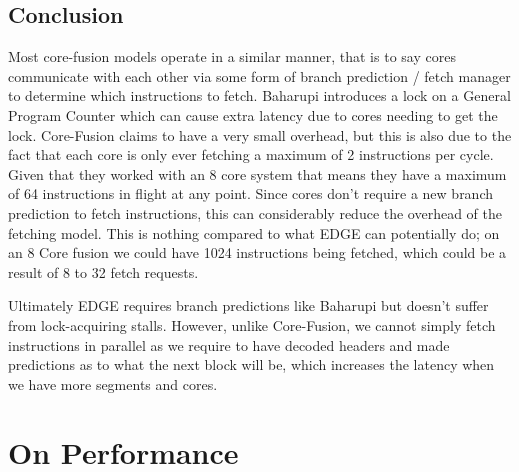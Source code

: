 \subsection{Conclusion}
Most core-fusion models operate in a similar manner, that is to say cores communicate with each other via some form of branch prediction / fetch manager to determine which instructions to fetch.
Baharupi introduces a lock on a General Program Counter which can cause extra latency due to cores needing to get the lock.
Core-Fusion claims to have a very small overhead, but this is also due to the fact that each core is only ever fetching a maximum of 2 instructions per cycle.
Given that they worked with an 8 core system that means they have a maximum of 64 instructions in flight at any point.
Since cores don't require a new branch prediction to fetch instructions, this can considerably reduce the overhead of the fetching model.
This is nothing compared to what EDGE can potentially do; on an 8 Core fusion we could have 1024 instructions being fetched, which could be a result of 8 to 32 fetch requests.

Ultimately EDGE requires branch predictions like Baharupi but doesn't suffer from lock-acquiring stalls.
However, unlike Core-Fusion, we cannot simply fetch instructions in parallel as we require to have decoded headers and made predictions as to what the next block will be, which increases the latency when we have more segments and cores.

\section{On Performance}
